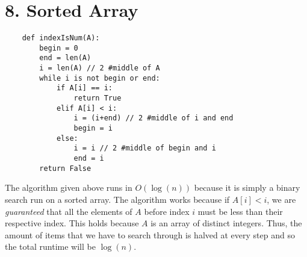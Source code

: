\documentclass[a4paper]{article}
\newcommand{\<}{\langle}
\renewcommand{\>}{\rangle}
\renewcommand{\^}{\wedge}
\begin{document}
\section{8. Sorted Array}
\begin{verbatim}
    def indexIsNum(A):
        begin = 0
        end = len(A)
        i = len(A) // 2 #middle of A
        while i is not begin or end:
            if A[i] == i:
                return True
            elif A[i] < i:
                i = (i+end) // 2 #middle of i and end
                begin = i
            else:
                i = i // 2 #middle of begin and i
                end = i
        return False
\end{verbatim}
The algorithm given above runs in $O(\log(n))$ because it is simply a binary search run on a sorted array. The algorithm works because if $A[i] < i$, we are \textit{guaranteed} that all the elements of $A$ before index $i$ must be less than their respective index. This holds because $A$ is an array of distinct integers. Thus, the amount of items that we have to search through is halved at every step and so the total runtime will be $\log(n)$.
\end{document}
